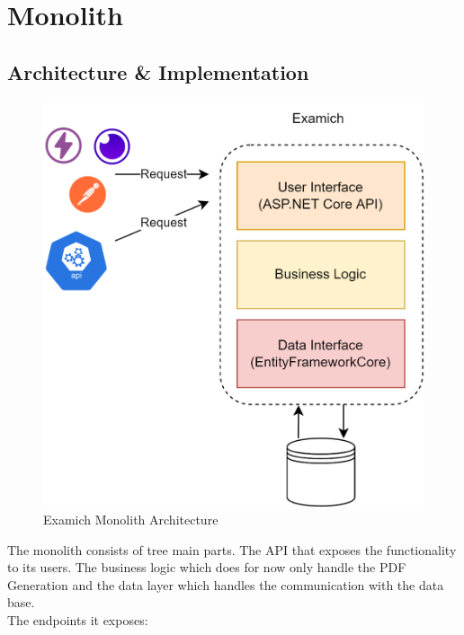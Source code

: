 \documentclass[BIF,Master,nenglish]{twbook}
\begin{document}
\section{Monolith}

\subsection{Architecture \& Implementation}

\begin{figure} [H]
 \begin{center}
    \includegraphics[width=0.6\linewidth]{img/ExamichMonolith.png}
 \end{center}
 \caption{Examich Monolith Architecture}
 \label{examichMonolith}
\end{figure}

The monolith consists of tree main parts. The API that exposes the functionality to its users. The business logic which does for now only handle the PDF Generation and the data layer which handles the communication with the data base.
\\
\noindent
The endpoints it exposes:
\end{document}
